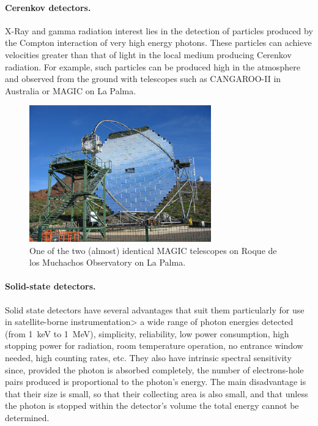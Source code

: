 \paragraph{Cerenkov detectors.} X-Ray and gamma radiation interest lies in the detection
of particles produced by the Compton interaction of very high energy photons. These
particles can achieve velocities greater than that of light in the local medium producing
Cerenkov radiation. For example, such particles can be produced high in the atmosphere 
and observed from the ground with telescopes such as CANGAROO-II in Australia or 
MAGIC on La Palma.

\begin{figure}[h]
  \centering
	\includegraphics[width=0.7\textwidth]{magic.eps}
  \caption{One of the two (almost) identical MAGIC telescopes on Roque
    de los Muchachos Observatory on La Palma.}
  \label{fig:magic}
\end{figure}                    

\paragraph{Solid-state detectors.} Solid state detectors have several advantages that suit them 
particularly for use in satellite-borne instrumentation> a wide range of photon energies
detected (from 1~keV to 1~MeV), simplicity, reliability, low power consumption, high
stopping power for radiation, room temperature operation, no entrance window needed,
high counting rates, etc. They also have intrinsic spectral sensitivity since, provided the 
photon is absorbed completely, the number of electrons-hole pairs produced is proportional
to the photon's energy. The main disadvantage is that their size is small, so that their 
collecting area is also small, and that unless the photon is stopped within the detector's
volume the total energy cannot be determined. 


